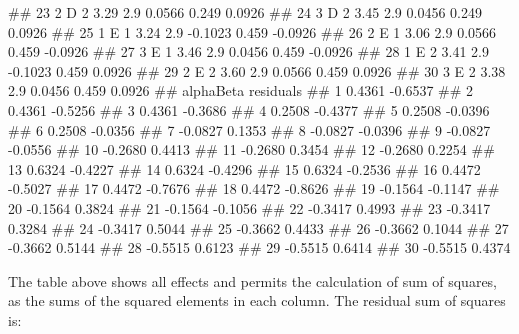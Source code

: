 \documentclass[a4paper,12pt,oneside]{book}
\newenvironment{Shaded}{\begin{snugshade}}{\end{snugshade}}
\newcommand{\DocumentationTok}[1]{#1}
\begin{document}
\begin{Shaded}
\begin{Highlighting}[]
\DocumentationTok{\#\# 23     2        D 2  3.29 2.9  0.0566  0.249  0.0926}
\DocumentationTok{\#\# 24     3        D 2  3.45 2.9  0.0456  0.249  0.0926}
\DocumentationTok{\#\# 25     1        E 1  3.24 2.9 {-}0.1023  0.459 {-}0.0926}
\DocumentationTok{\#\# 26     2        E 1  3.06 2.9  0.0566  0.459 {-}0.0926}
\DocumentationTok{\#\# 27     3        E 1  3.46 2.9  0.0456  0.459 {-}0.0926}
\DocumentationTok{\#\# 28     1        E 2  3.41 2.9 {-}0.1023  0.459  0.0926}
\DocumentationTok{\#\# 29     2        E 2  3.60 2.9  0.0566  0.459  0.0926}
\DocumentationTok{\#\# 30     3        E 2  3.38 2.9  0.0456  0.459  0.0926}
\DocumentationTok{\#\#    alphaBeta residuals}
\DocumentationTok{\#\# 1     0.4361   {-}0.6537}
\DocumentationTok{\#\# 2     0.4361   {-}0.5256}
\DocumentationTok{\#\# 3     0.4361   {-}0.3686}
\DocumentationTok{\#\# 4     0.2508   {-}0.4377}
\DocumentationTok{\#\# 5     0.2508   {-}0.0396}
\DocumentationTok{\#\# 6     0.2508   {-}0.0356}
\DocumentationTok{\#\# 7    {-}0.0827    0.1353}
\DocumentationTok{\#\# 8    {-}0.0827   {-}0.0396}
\DocumentationTok{\#\# 9    {-}0.0827   {-}0.0556}
\DocumentationTok{\#\# 10   {-}0.2680    0.4413}
\DocumentationTok{\#\# 11   {-}0.2680    0.3454}
\DocumentationTok{\#\# 12   {-}0.2680    0.2254}
\DocumentationTok{\#\# 13    0.6324   {-}0.4227}
\DocumentationTok{\#\# 14    0.6324   {-}0.4296}
\DocumentationTok{\#\# 15    0.6324   {-}0.2536}
\DocumentationTok{\#\# 16    0.4472   {-}0.5027}
\DocumentationTok{\#\# 17    0.4472   {-}0.7676}
\DocumentationTok{\#\# 18    0.4472   {-}0.8626}
\DocumentationTok{\#\# 19   {-}0.1564   {-}0.1147}
\DocumentationTok{\#\# 20   {-}0.1564    0.3824}
\DocumentationTok{\#\# 21   {-}0.1564   {-}0.1056}
\DocumentationTok{\#\# 22   {-}0.3417    0.4993}
\DocumentationTok{\#\# 23   {-}0.3417    0.3284}
\DocumentationTok{\#\# 24   {-}0.3417    0.5044}
\DocumentationTok{\#\# 25   {-}0.3662    0.4433}
\DocumentationTok{\#\# 26   {-}0.3662    0.1044}
\DocumentationTok{\#\# 27   {-}0.3662    0.5144}
\DocumentationTok{\#\# 28   {-}0.5515    0.6123}
\DocumentationTok{\#\# 29   {-}0.5515    0.6414}
\DocumentationTok{\#\# 30   {-}0.5515    0.4374}
\end{Highlighting}
\end{Shaded}

\normalsize

The table above shows all effects and permits the calculation of sum of squares, as the sums of the squared elements in each column. The residual sum of squares is:

\vspace{12pt}
\end{document}
